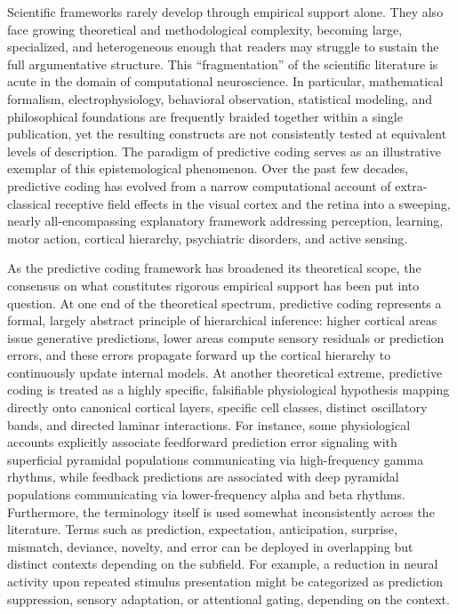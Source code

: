 \documentclass[12pt]{article}
\begin{document}
Scientific frameworks rarely develop through empirical support alone\cite{ref1}. They also face growing theoretical and methodological complexity, becoming large, specialized, and heterogeneous enough that readers may struggle to sustain the full argumentative structure\cite{ref2,ref3,ref4,ref5}. This ``fragmentation'' of the scientific literature is acute in the domain of computational neuroscience. In particular, mathematical formalism, electrophysiology, behavioral observation, statistical modeling, and philosophical foundations are frequently braided together within a single publication, yet the resulting constructs are not consistently tested at equivalent levels of description. The paradigm of predictive coding serves as an illustrative exemplar of this epistemological phenomenon. Over the past few decades, predictive coding has evolved from a narrow computational account of extra-classical receptive field effects in the visual cortex\cite{ref6} and the retina\cite{ref7} into a sweeping, nearly all-encompassing explanatory framework addressing perception\cite{ref8,ref9}, learning\cite{ref10}, motor action\cite{ref11,ref12}, cortical hierarchy\cite{ref13,ref14}, psychiatric disorders\cite{ref15,ref16}, and active sensing\cite{ref11,ref17}.

As the predictive coding framework has broadened its theoretical scope, the consensus on what constitutes rigorous empirical support has been put into question\cite{ref18,ref19}. At one end of the theoretical spectrum, predictive coding represents a formal, largely abstract principle of hierarchical inference: higher cortical areas issue generative predictions, lower areas compute sensory residuals or prediction errors, and these errors propagate forward up the cortical hierarchy to continuously update internal models\cite{ref20,ref21}. At another theoretical extreme, predictive coding is treated as a highly specific, falsifiable physiological hypothesis mapping directly onto canonical cortical layers, specific cell classes, distinct oscillatory bands, and directed laminar interactions\cite{ref14,ref22,ref23}. For instance, some physiological accounts explicitly associate feedforward prediction error signaling with superficial pyramidal populations communicating via high-frequency gamma rhythms\cite{ref24}, while feedback predictions are associated with deep pyramidal populations communicating via lower-frequency alpha and beta rhythms\cite{ref25,ref26}. Furthermore, the terminology itself is used somewhat inconsistently across the literature. Terms such as prediction, expectation, anticipation, surprise, mismatch, deviance, novelty, and error can be deployed in overlapping but distinct contexts depending on the subfield. For example, a reduction in neural activity upon repeated stimulus presentation might be categorized as prediction suppression, sensory adaptation, or attentional gating, depending on the context.
\end{document}
